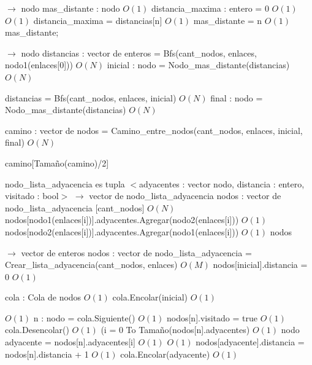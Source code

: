 \documentclass[a4paper, 10pt, twoside]{article}
\newenvironment{pseudo}[1][]{%
    \vspace{0.5em}%
    \begin{algorithmic}%
}
{%
    \end{algorithmic}%
    \vspace{0.5em}%
}
\newcommand{\Ode}[1]{\hfill $O(#1)$}
\begin{document}
\begin{pseudo}
 $\rightarrow$ nodo
  \State mas\_distante : nodo                         \Ode{1}
  \State distancia\_maxima : entero = 0                   \Ode{1}
                    \Ode{1}
      \State distancia\_maxima = distancias[n]                \Ode{1}
      \State mas\_distante = n                        \Ode{1}
    \EndIf
  \EndFor
  \Return mas\_distante;
\EndProcedure

 $\rightarrow$ nodo
  \State distancias : vector de enteros = Bfs(cant\_nodos, enlaces, nodo1(enlaces[0])) \Ode{N}
  \State inicial : nodo = Nodo\_mas\_distante(distancias)           \Ode{N}

  \State distancias = Bfs(cant\_nodos, enlaces, inicial)            \Ode{N}
  \State final : nodo = Nodo\_mas\_distante(distancias)           \Ode{N}

  \State camino : vector de nodos = Camino\_entre\_nodos(cant\_nodos, enlaces, inicial, final) \Ode{N}
  
  \Return camino[Tamaño(camino)/2]
\EndProcedure

nodo\_lista\_adyacencia es tupla $<$adyacentes : vector nodo, distancia : entero, visitado : bool$>$
 $\rightarrow$ vector de nodo\_lista\_adyacencia
  \State nodos : vector de nodo\_lista\_adyacencia [cant\_nodos]        \Ode{N}
    \State nodos[nodo1(enlaces[i])].adyacentes.Agregar(nodo2(enlaces[i])) \Ode{1}
    \State nodos[nodo2(enlaces[i])].adyacentes.Agregar(nodo1(enlaces[i])) \Ode{1}
   \EndFor
  \Return nodos
\EndProcedure

 $\rightarrow$ vector de enteros
  \State nodos : vector de nodo\_lista\_adyacencia = Crear\_lista\_adyacencia(cant\_nodos, enlaces) \Ode{M}
  \State nodos[inicial].distancia = 0                     \Ode{1}

  \State cola : Cola de nodos                         \Ode{1}
  \State cola.Encolar(inicial)                        \Ode{1}
  
                             \Ode{1}
    \State n : nodo = cola.Siguiente()                    \Ode{1}
    \State nodos[n].visitado = true                     \Ode{1}
    \State cola.Desencolar()                        \Ode{1}
    \For({i = 0 To Tamaño(nodos[n].adyacentes)}               \Ode{1}
      \State nodo adyacente = nodos[n].adyacentes[i]            \Ode{1}
                      \Ode{1}
        \State nodos[adyacente].distancia = nodos[n].distancia + 1    \Ode{1}
        \State cola.Encolar(adyacente)                  \Ode{1}
      \EndIf
    \EndFor
  \EndWhile


\end{pseudo}
\end{document}
